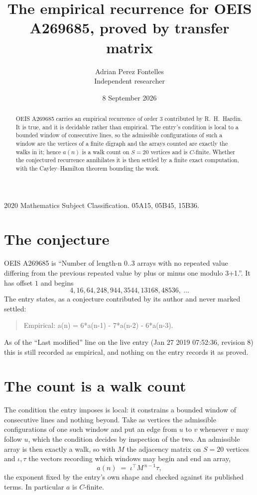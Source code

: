 \documentclass[11pt,a4paper]{article}
\title{The empirical recurrence for OEIS A269685, proved by transfer matrix}
\author{Adrian Perez Fontelles\\ \small Independent researcher}
\date{8 September 2026}
\theoremstyle{plain}
\theoremstyle{definition}
\begin{document}
\maketitle

\begin{abstract}
OEIS A269685 carries an empirical recurrence of order $3$ contributed by R.~H.~Hardin. It is
true, and it is decidable rather than empirical. The entry's condition is local to a bounded window of consecutive lines, so
the admissible configurations of such a window are the vertices of a finite digraph and the
arrays counted are exactly the walks in it; hence $a(n)$ is a walk count on $S=20$ vertices
and is $C$-finite. Whether the conjectured recurrence annihilates it is then settled by a
finite exact computation, with the Cayley--Hamilton theorem bounding the work.
\end{abstract}

\noindent\small 2020 Mathematics Subject Classification. 05A15, 05B45, 15B36.\normalsize

\section{The conjecture}

OEIS A269685 is ``Number of length-n 0..3 arrays with no repeated value differing from the previous repeated value by plus or minus one modulo 3+1.''. It has offset $1$ and begins
\[
4, 16, 64, 248, 944, 3544, 13168, 48536,\ \dots
\]
The entry states, as a conjecture contributed by its author and never marked settled:
\begin{quote}
Empirical: a(n) = 6*a(n-1) - 7*a(n-2) - 6*a(n-3).
\end{quote}
As of the ``Last modified'' line on the live entry (Jan 27 2019 07:52:36, revision 8) this is still
recorded as empirical, and nothing on the entry records it as proved.

\section{The count is a walk count}

The condition the entry imposes is local: it constrains a bounded window of consecutive lines and nothing beyond. Take as
vertices the admissible configurations of one such window and put an edge from $u$ to $v$
whenever $v$ may follow $u$, which the condition decides by inspection of the two. An
admissible array is then exactly a walk, so with $M$ the adjacency matrix on $S=20$ vertices
and $\iota,\tau$ the vectors recording which windows may begin and end an array,
\[
a(n)\;=\;\iota^{\!\top}M^{\,n-1}\tau ,
\]
the exponent fixed by the entry's own shape and checked against its published terms. In
particular $a$ is $C$-finite.
\end{document}
